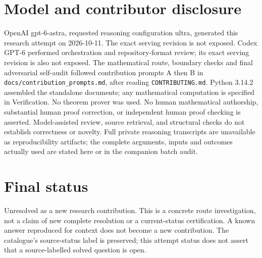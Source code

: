 \documentclass[11pt]{article}
\begin{document}
\section{Model and contributor disclosure}
OpenAI gpt-6-astra, requested reasoning configuration ultra, generated this research
attempt on 2026-10-11. The exact serving revision is not exposed. Codex GPT-6
performed orchestration and repository-format review; its exact serving revision
is also not exposed. The mathematical route, boundary checks and final adversarial
self-audit followed contribution prompts A then B in
\texttt{docs/contribution\_prompts.md}, after reading \texttt{CONTRIBUTING.md}.
Python 3.14.2 assembled the standalone documents; any mathematical computation is
specified in Verification. No theorem prover was used. No human mathematical
authorship, substantial human proof correction, or independent human proof checking
is asserted. Model-assisted review, source retrieval, and structural checks do not
establish correctness or novelty. Full private reasoning transcripts are unavailable
as reproducibility artifacts; the complete arguments, inputs and outcomes actually
used are stated here or in the companion batch audit.
\section{Final status}
Unresolved as a new research contribution. This is a concrete route investigation,
not a claim of new complete resolution or a current-status certification. A known
answer reproduced for context does not become a new contribution. The catalogue's
source-status label is preserved; this attempt status does not assert that a
source-labelled solved question is open.
\end{document}
